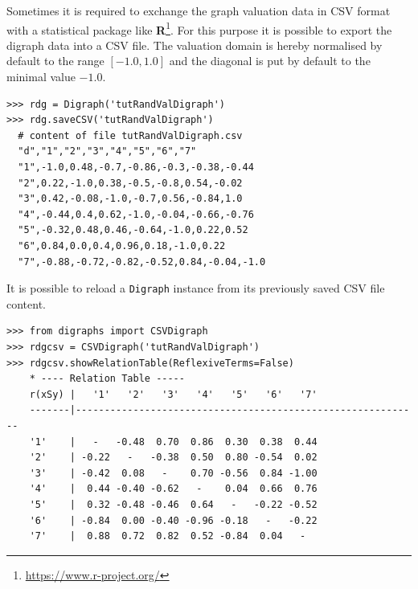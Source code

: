 Sometimes it is required to exchange the graph valuation data in CSV format with a statistical package like \textbf{R}\footnote{\url{https://www.r-project.org/}}. For this purpose it is possible to export the digraph data into a CSV file. The valuation domain is hereby normalised by default to the range $[-1.0,1.0]$ and the diagonal is put by default to the minimal value $-1.0$.
\begin{lstlisting}
>>> rdg = Digraph('tutRandValDigraph')
>>> rdg.saveCSV('tutRandValDigraph')
  # content of file tutRandValDigraph.csv
  "d","1","2","3","4","5","6","7"
  "1",-1.0,0.48,-0.7,-0.86,-0.3,-0.38,-0.44
  "2",0.22,-1.0,0.38,-0.5,-0.8,0.54,-0.02
  "3",0.42,-0.08,-1.0,-0.7,0.56,-0.84,1.0
  "4",-0.44,0.4,0.62,-1.0,-0.04,-0.66,-0.76
  "5",-0.32,0.48,0.46,-0.64,-1.0,0.22,0.52
  "6",0.84,0.0,0.4,0.96,0.18,-1.0,0.22
  "7",-0.88,-0.72,-0.82,-0.52,0.84,-0.04,-1.0
\end{lstlisting}
  
It is possible to reload a \texttt{Digraph} instance from its previously saved CSV file content.
\begin{lstlisting} 
>>> from digraphs import CSVDigraph   
>>> rdgcsv = CSVDigraph('tutRandValDigraph')
>>> rdgcsv.showRelationTable(ReflexiveTerms=False)
    * ---- Relation Table -----
    r(xSy) |   '1'   '2'   '3'   '4'   '5'   '6'   '7'	  
    -------|------------------------------------------------------------
    '1'    |   -   -0.48  0.70  0.86  0.30  0.38  0.44	 
    '2'    | -0.22   -   -0.38  0.50  0.80 -0.54  0.02	 
    '3'    | -0.42  0.08   -    0.70 -0.56  0.84 -1.00	 
    '4'    |  0.44 -0.40 -0.62   -    0.04  0.66  0.76	 
    '5'    |  0.32 -0.48 -0.46  0.64   -   -0.22 -0.52	 
    '6'    | -0.84  0.00 -0.40 -0.96 -0.18   -   -0.22	 
    '7'    |  0.88  0.72  0.82  0.52 -0.84  0.04   -
\end{lstlisting}
  

